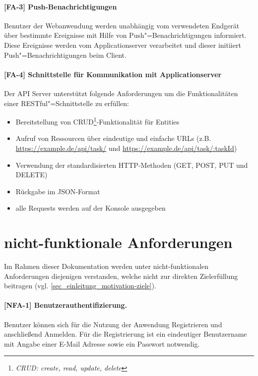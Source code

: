 \paragraph{[FA-3] Push-Benachrichtigungen}\label{fa-3} Benutzer der Webanwendung werden unabhängig vom verwendeten Endgerät über bestimmte Ereignisse mit Hilfe von Push"=Benachrichtigungen informiert. Diese Ereignisse werden vom Applicationserver verarbeitet und dieser initiiert Push"=Benachrichtigungen beim Client. 

\paragraph{[FA-4] Schnittstelle für Kommunikation mit Applicationserver}\label{fa-4} Der API Server unterstützt folgende Anforderungen um die Funktionalitäten einer RESTful"=Schnittstelle zu erfüllen:

\begin{itemize}
\setlength{\itemsep}{0pt}%
\setlength{\parskip}{0pt}%
\item Bereitstellung von CRUD\footnote{\textit{CRUD: create, read, update, delete}}-Funktionalität für Entities
\item Aufruf von Ressourcen über eindeutige und einfache URLs (z.B. \url{https://example.de/api/task/} und \url{https://example.de/api/task/:taskId}) 
\item Verwendung der standardisierten HTTP-Methoden (GET, POST, PUT und DELETE) 
\item Rückgabe im JSON-Format
\item alle Requests werden auf der Konsole ausgegeben
\end{itemize}  

\newpage
\section{nicht-funktionale Anforderungen}
\label{sec_anforderungen_nicht-funktionale-anforderungen}

Im Rahmen dieser Dokumentation werden unter nicht-funktionalen Anforderungen diejenigen verstanden, welche nicht zur direkten Zielerfüllung beitragen (vgl. \ref{sec_einleitung_motivation-ziele}).


\paragraph{[NFA-1] Benutzerauthentifizierung.} Benutzer können sich für die Nutzung der Anwendung Registrieren und anschließend Anmelden. Für die Registrierung ist ein eindeutiger Benutzername mit Angabe einer E-Mail Adresse sowie ein Passwort notwendig.

